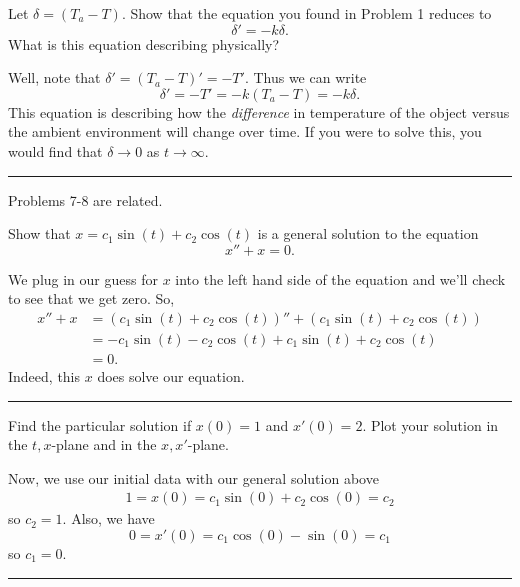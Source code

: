 \documentclass[12pt]{article} %
\begin{document}
\begin{problem}
    Let $\delta = (T_a-T)$. Show that the equation you found in Problem 1 reduces to
    \[
    \delta' = -k\delta.
    \]
    What is this equation describing physically?
\end{problem}
\begin{solution}
Well, note that $\delta'=(T_a-T)'=-T'$.  Thus we can write
\[
\delta'=-T'=-k(T_a-T)=-k\delta.
\]
This equation is describing how the \emph{difference} in temperature of the object versus the ambient environment will change over time. If you were to solve this, you would find that $\delta\to 0$ as $t\to \infty$.
\end{solution}

\hrule

\begin{center}
    Problems 7-8 are related.
\end{center}
\begin{problem}
    Show that $x=c_1\sin(t)+c_2\cos(t)$ is a general solution to the equation
    \[
        x''+x=0.
    \]
\end{problem}
\begin{solution}
We plug in our guess for $x$ into the left hand side of the equation and we'll check to see that we get zero.  So,
\begin{align*}
    x''+x&=(c_1\sin(t)+c_2\cos(t))''+(c_1\sin(t)+c_2\cos(t))\\
    &= -c_1\sin(t)-c_2\cos(t)+c_1\sin(t)+c_2\cos(t)\\
    &=0.
\end{align*}
Indeed, this $x$ does solve our equation.
\end{solution}

\hrule

\begin{problem}
    Find the particular solution if $x(0)=1$ and $x'(0)=2$. Plot your solution in the $t,x$-plane and in the $x,x'$-plane. 
\end{problem}
\begin{solution}
Now, we use our initial data with our general solution above
\begin{align*}
    1=x(0)=c_1\sin(0)+c_2\cos(0)=c_2
\end{align*}
so $c_2=1$.  Also, we have
\[
0=x'(0)=c_1\cos(0)-\sin(0)=c_1
\]
so $c_1=0$.
\end{solution}

\hrule
\end{document}
